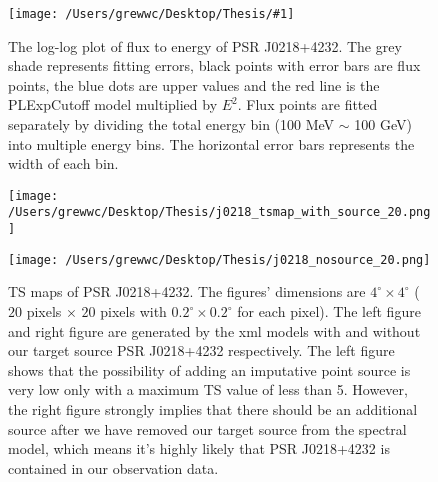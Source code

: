 \documentclass[12pt]{report}
\newcommand{\singleFig}[3]{
  \begin{figure}[!ht]
    \centering
    \texttt{[image: /Users/grewwc/Desktop/Thesis/\#1]}
    \caption{#3}
    \label{fig: #1}
  \end{figure}
}
\newcommand{\change}[1]{
  $<$\colorbox{red}{\textbf{change}}$>$#1$<$\colorbox{red}{\textbf{/change}}$>$
}
\begin{document}
            \singleFig{j0218_cur.png}{0.40}{The log-log plot of flux to energy of PSR J0218+4232. The grey shade represents 
              fitting errors, black points with error bars are flux points, the blue dots are upper values and the 
              red line is the PLExpCutoff model multiplied by $E^2$. Flux points 
              are fitted separately by dividing the total energy bin (100 MeV $\sim$ 100 GeV) into multiple energy bins.
              The horizontal error bars represents the width of each bin. }
            \vspace{1cm}
            \begin{figure}[!ht]
              \begin{center}
              \begin{minipage}{0.46\textwidth}
                \begin{center} 
                  \texttt{[image: /Users/grewwc/Desktop/Thesis/j0218\_tsmap\_with\_source\_20.png]}
                \end{center}
              \end{minipage}
              \begin{minipage}{0.45\textwidth}
                \begin{center}
                  \texttt{[image: /Users/grewwc/Desktop/Thesis/j0218\_nosource\_20.png]}
                \end{center}
              \end{minipage}
            \end{center}
            \caption{TS maps of PSR J0218+4232. The figures' dimensions are 
            $4^{\circ} \times 4^{\circ}$ ($20$ pixels $\times$ $20$ pixels with 
            $0.2^{\circ} \times 0.2^{\circ}$ for each pixel). The \textsf{left}
            figure and \textsf{right} figure are generated by the xml models with and without our 
            target source PSR J0218+4232 respectively. The \textsf{left} figure shows that the 
            possibility of adding an imputative point source is very low only with a maximum TS value of 
            less than 5. However, the \textsf{right} figure strongly implies that there should be an 
            additional source after we have removed our target source from the spectral model, 
            which means it's highly likely that PSR J0218+4232 is contained in our observation data.}
            \label{fig: j0218_tsmap_comparison_20}
            \end{figure}
\end{document}
